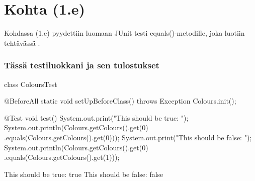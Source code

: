 \pagebreak

\section{Kohta (1.e)}

\label{Kohta (1.e)}

Kohdassa (1.e) pyydettiin luomaan JUnit testi equals()-metodille, joka luotiin tehtävässä \cite{Kohta (1.b)}.

\subsubsection{Tässä testiluokkani ja sen tulostukset}

\label{Tässä testiluokkani ja sen tulostukset}
\begin{javacode}
class ColoursTest {

	@BeforeAll
	static void setUpBeforeClass() throws Exception {
		Colours.init();
	}

	@Test
	void test() {
		System.out.print("This should be true: ");
		System.out.println(Colours.getColours().get(0)
			.equals(Colours.getColours().get(0)));
		System.out.print("This should be false: ");
		System.out.println(Colours.getColours().get(0)
			.equals(Colours.getColours().get(1)));
	}

}

This should be true: true
This should be false: false
\end{javacode}